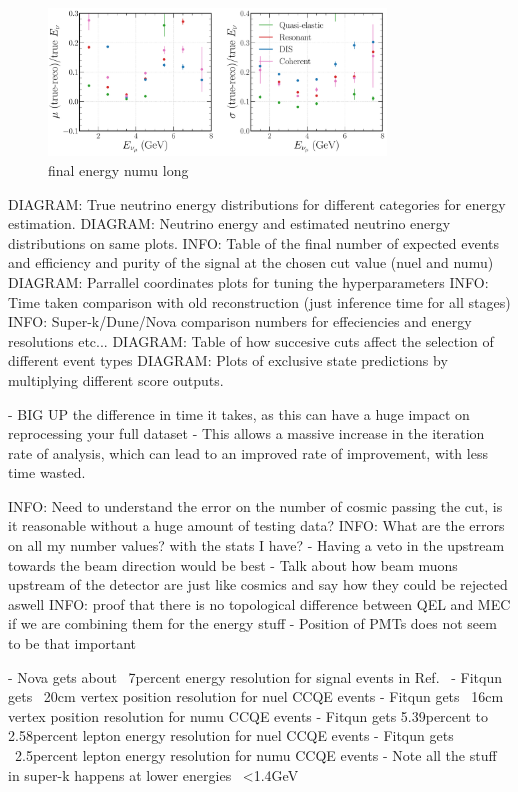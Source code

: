 \begin{figure} %
    \includegraphics[width=0.8\textwidth]{diagrams/6-cvn/chipsnet/final_energy_numu.pdf}
    \caption[final energy numu short]
    {final energy numu long}
    \label{fig:final_energy_numu}
\end{figure}

DIAGRAM: True neutrino energy distributions for different categories for energy estimation.
DIAGRAM: Neutrino energy and estimated neutrino energy distributions on same plots.
INFO: Table of the final number of expected events and efficiency and purity of the signal at the
chosen cut value (nuel and numu)
DIAGRAM: Parrallel coordinates plots for tuning the hyperparameters
INFO: Time taken comparison with old reconstruction (just inference time for all stages)
INFO: Super-k/Dune/Nova comparison numbers for effeciencies and energy resolutions etc...
DIAGRAM: Table of how succesive cuts affect the selection of different event types
DIAGRAM: Plots of exclusive state predictions by multiplying different score outputs.

- BIG UP the difference in time it takes, as this can have a huge impact on reprocessing your full
dataset
- This allows a massive increase in the iteration rate of analysis, which can lead to an improved
rate of improvement, with less time wasted.

INFO: Need to understand the error on the number of cosmic passing the cut, is it reasonable
without a huge amount of testing data?
INFO: What are the errors on all my number values? with the stats I have?
- Having a veto in the upstream towards the beam direction would be best
- Talk about how beam muons upstream of the detector are just like cosmics and say how they could
be rejected aswell
INFO: proof that there is no topological difference between QEL and MEC if we are combining them
for the energy stuff
- Position of PMTs does not seem to be that important

- Nova gets about ~7percent energy resolution for signal events
in Ref.~\cite{jiang2019}
- Fitqun gets ~20cm vertex position resolution for nuel CCQE events
- Fitqun gets ~16cm vertex position resolution for numu CCQE events
- Fitqun gets 5.39percent to 2.58percent lepton energy resolution for nuel CCQE events
- Fitqun gets ~2.5percent lepton energy resolution for numu CCQE events
- Note all the stuff in super-k happens at lower energies ~<1.4GeV

